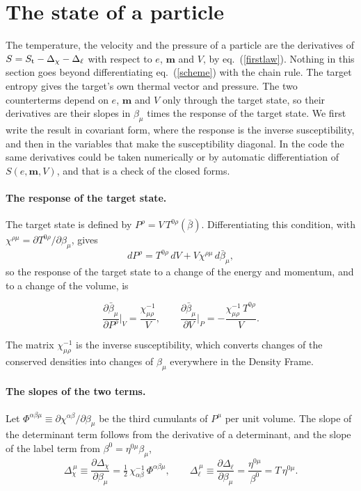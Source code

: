 \documentclass[11pt,aps,preprint,nofootinbib,superscriptaddress,tightenlines]{revtex4-2}
\def\st{\begin{equation}}
\def\stp{\end{equation}}
\def\Eq#1{eq.~(\ref{#1})}
\let\oldparagraph\paragraph
\renewcommand{\paragraph}{\par\bigskip\oldparagraph}
\begin{document}
\section{The state of a particle}
\label{sec:state}

The temperature, the velocity and the pressure of a particle are the derivatives of $S=S_{\rm t}-\Delta_\chi-\Delta_\ell$ with respect to $e$, $\bm m$ and
$V$, by \Eq{firstlaw}.  Nothing in this section goes beyond differentiating \Eq{scheme} with the chain rule.  The target entropy gives the target's
own thermal vector and pressure.  The two counterterms depend on $e$, $\bm m$ and $V$ only through the target state, so their derivatives are their
slopes in $\beta_\mu$ times the response of the target state.  We first write the result in covariant form, where the response is the inverse
susceptibility, and then in the variables that make the susceptibility diagonal.  In the code the same derivatives could be taken numerically or by
automatic differentiation of $S(e,\bm m,V)$, and that is a check of the closed forms.

\paragraph{The response of the target state.}  The target state is defined by $P^\rho=V\,T^{0\rho}(\bar\beta)$.  Differentiating this condition, with
$\chi^{\rho\mu}=\partial T^{0\rho}/\partial\beta_\mu$, gives
\st
dP^\rho=T^{0\rho}\,dV+V\chi^{\rho\mu}\,d\bar\beta_\mu ,
\stp
so the response of the target state to a change of the energy and momentum, and to a change of the volume, is
\begin{keyeq}
\st
\frac{\partial\bar\beta_\mu}{\partial P^\rho}\bigg|_V=\frac{\chi^{-1}_{\mu\rho}}V,\qquad
\frac{\partial\bar\beta_\mu}{\partial V}\bigg|_P=-\frac{\chi^{-1}_{\mu\rho}\,T^{0\rho}}V .
\label{covresponse}
\stp
\end{keyeq}
The matrix $\chi^{-1}_{\mu\rho}$ is the inverse susceptibility, which converts changes of the conserved densities into changes of $\beta_\mu$ everywhere
in the Density Frame.

\paragraph{The slopes of the two terms.}  Let $\Phi^{\alpha\beta\mu}\equiv\partial\chi^{\alpha\beta}/\partial\beta_\mu$ be the third cumulants of $P^\mu$ per
unit volume.  The slope of the determinant term follows from the derivative of a determinant, and the slope of the label term from
$\beta^0=\eta^{0\mu}\beta_\mu$,
\st
\Delta_\chi^{\,\mu}\equiv\frac{\partial\Delta_\chi}{\partial\beta_\mu}=\tfrac12\,\chi^{-1}_{\alpha\beta}\,\Phi^{\alpha\beta\mu},\qquad
\Delta_\ell^{\,\mu}\equiv\frac{\partial\Delta_\ell}{\partial\beta_\mu}=\frac{\eta^{0\mu}}{\beta^0}=T\,\eta^{0\mu} .
\label{covslopes}
\stp
\end{document}

